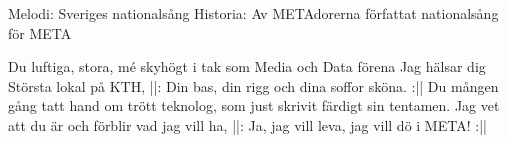 \begin{song}

\begin{songmeta}
Melodi: Sveriges nationalsång 
Historia: Av METAdorerna författat nationalsång för META 
\end{songmeta}

\begin{songtext}
Du luftiga, stora, mé skyhögt i tak
som Media och Data förena
Jag hälsar dig Största lokal på KTH,
||: Din bas, din rigg och dina soffor sköna. :||
Du mången gång tatt hand om trött teknolog,
som just skrivit färdigt sin tentamen.
Jag vet att du är och förblir vad jag vill ha,
||: Ja, jag vill leva, jag vill dö i META! :||
\end{songtext}
\end{song}

